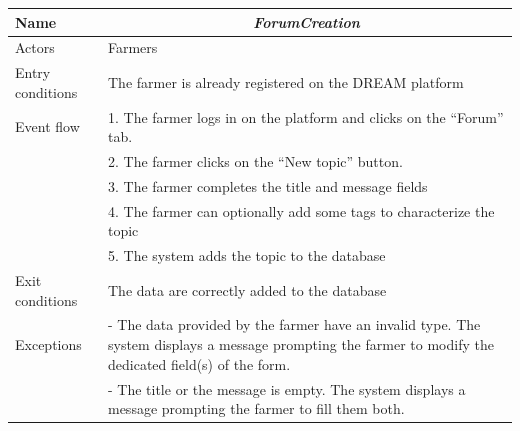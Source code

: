 \begin{table}[H]
	\centering
	\begin{tabularx}{\linewidth}{|l|X|}
		\hline
		Name & \multicolumn{1}{c|}{\textit{\textbf{ForumCreation}}}                                                   \tabularnewline \hline
		Actors                                               & Farmers                                                    \tabularnewline \hline
		Entry conditions                                              &
		The farmer is already registered on the DREAM platform
		\tabularnewline
		Event flow                                         & 1.	The farmer logs in on the platform and clicks on the “Forum” tab.                                           \tabularnewline 
		& 2.	The farmer clicks on the “New topic” button.                                            \tabularnewline 
		& 3.	The farmer completes the title and message fields                                            \tabularnewline 
		& 4.	The farmer can optionally add some tags to characterize the topic                                    
		\tabularnewline 
		&
		5.	The system adds the topic to the database
		\tabularnewline \hline
		Exit conditions 
		&  The data are correctly added to the database
		\tabularnewline \hline
		Exceptions 
		& 
		-	The data provided by the farmer have an invalid type. The system displays a message prompting the farmer to modify the dedicated field(s) of the form.
		\tabularnewline
		&-	The title or the message is empty. The system displays a message prompting the farmer to fill them both.
		\tabularnewline
		\hline
	\end{tabularx}   
\end{table}

